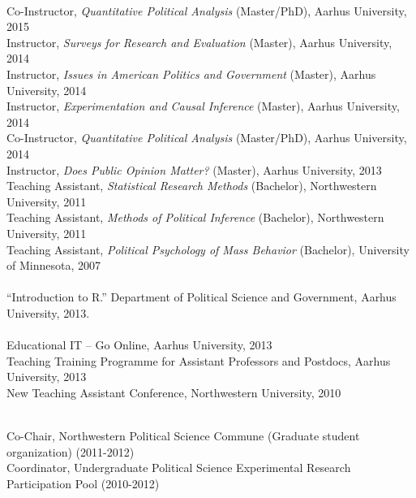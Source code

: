\documentclass[12pt]{article}
\renewcommand{\section}[1]{\pagebreak[3]%
    \llap{\scshape\smash{\parbox[t]{\marginparwidth}{\raggedright {\color{lg}#1}}}}%
    \vspace{-\baselineskip}\par}
\newcommand{\topic}[1]{\pagebreak[3]\indent {\color{lg}{\footnotesize #1 }}\\}
\newcommand{\entry}[1]{\indent {\color{lg}\guillemotright}\hspace{2pt}#1\vspace{.25em}\\}
\begin{document}
\section{Teaching}
\topic{Experience}
\entry{Co-Instructor, {\em Quantitative Political Analysis} (Master/PhD), Aarhus University, 2015}
\entry{Instructor, {\em Surveys for Research and Evaluation} (Master), Aarhus University, 2014}
\entry{Instructor, {\em Issues in American Politics and Government} (Master), Aarhus University, 2014}
\entry{Instructor, {\em Experimentation and Causal Inference} (Master), Aarhus University, 2014}
\entry{Co-Instructor, {\em Quantitative Political Analysis} (Master/PhD), Aarhus University, 2014}
\entry{Instructor, {\em Does Public Opinion Matter?} (Master), Aarhus University, 2013}
\entry{Teaching Assistant, {\em Statistical Research Methods} (Bachelor), Northwestern University, 2011} %
\entry{Teaching Assistant, {\em Methods of Political Inference} (Bachelor), Northwestern University, 2011} %
\entry{Teaching Assistant, {\em Political Psychology of Mass Behavior} (Bachelor), University of Minnesota, 2007} %

\topic{Short courses}
\entry{``Introduction to R.'' Department of Political Science and Government, Aarhus University, 2013.}

\topic{Training}
\entry{Educational IT -- Go Online, Aarhus University, 2013}
\entry{Teaching Training Programme for Assistant Professors and Postdocs, Aarhus University, 2013}
\entry{New Teaching Assistant Conference, Northwestern University, 2010}

\section{Service}
\topic{Departmental}
\entry{Co-Chair, Northwestern Political Science Commune (Graduate student organization) (2011-2012)}
\entry{Coordinator, Undergraduate Political Science Experimental Research Participation Pool (2010-2012)}
\end{document}
